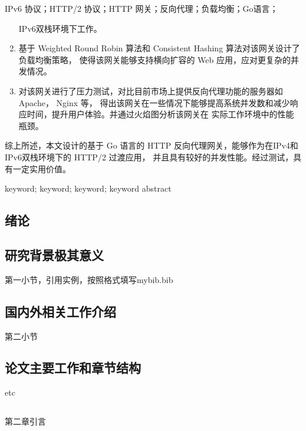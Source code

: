 \documentclass[twoside]{CUGThesis}
\begin{document}
\begin{cnabstract}{IPv6 协议；HTTP/2 协议；HTTP 网关；反向代理；负载均衡；Go语言； }
\begin{enumerate}
		IPv6双栈环境下工作。
		\item 基于 Weighted Round Robin 算法和 Consistent Hashing 算法对该网关设计了负载均衡策略，
		使得该网关能够支持横向扩容的 Web 应用，应对更复杂的并发情况。
		\item 对该网关进行了压力测试，对比目前市场上提供反向代理功能的服务器如 Apache， Nginx 等，
		得出该网关在一些情况下能够提高系统并发数和减少响应时间，提升用户体验。并通过火焰图分析该网关在
		实际工作环境中的性能瓶颈。
	\end{enumerate}
		\par
		综上所述，本文设计的基于 Go 语言的 HTTP 反向代理网关，能够作为在IPv4和IPv6双栈环境下的 HTTP/2 过渡应用，
	并且具有较好的并发性能。经过测试，具有一定实用价值。
	\end{cnabstract}
	
	\begin{enabstract}{keyword; keyword; keyword; keyword}
		abstract
	\end{enabstract}
	
	\makeToc
	
	
	\begin{spacing}{2}
		\section{绪论}
	\end{spacing}
	\subsection{研究背景极其意义}
	第一小节，引用实例\cite{引用}，按照格式填写mybib.bib
	\subsection{国内外相关工作介绍}
	第二小节
	\subsection{论文主要工作和章节结构}
	etc
	
	
	\begin{spacing}{2}
		\section{}
	\end{spacing}
	第二章引言
\end{document}
